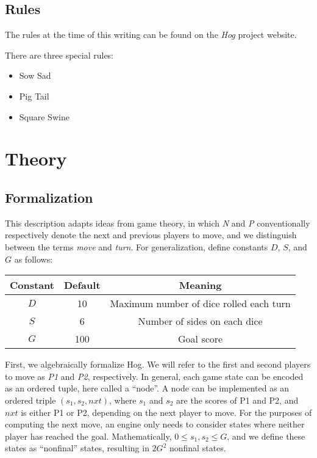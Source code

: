 \documentclass[12 pt]{article}
\begin{document}
		\subsection{Rules}
			The rules at the time of this writing can be found on the \textit{Hog} project website.

			There are three special rules:
			\begin{itemize}
				\item Sow Sad
				\item Pig Tail
				\item Square Swine
			\end{itemize}

	\section{Theory}
		\subsection{Formalization}
			This description adapts ideas from game theory, in which \textit{N} and \textit{P} conventionally respectively denote the next and previous players to move, and we distinguish between the terms \textit{move} and \textit{turn}. For generalization, define constants $D$, $S$, and $G$ as follows:

			\begin{center}
				\begin{tabular}{|c|c|c|}
					\hline
					Constant & Default & Meaning \\
					\hline
					$D$ & 10 & Maximum number of dice rolled each turn \\
					$S$ & 6 & Number of sides on each dice \\
					$G$ & 100 & Goal score \\
					\hline
				\end{tabular}
			\end{center}

			First, we algebraically formalize Hog. We will refer to the first and second players to move as \textit{P1} and \textit{P2}, respectively. In general, each game state can be encoded as an ordered tuple, here called a ``node''. A node can be implemented as an ordered triple $(s_1, s_2, \mathit{nxt})$, where $s_1$ and $s_2$ are the scores of P1 and P2, and $\mathit{nxt}$ is either P1 or P2, depending on the next player to move. For the purposes of computing the next move, an engine only needs to consider states where neither player has reached the goal. Mathematically, $0 \le s_1, s_2 \le G$, and we define these states as ``nonfinal'' states, resulting in $2G^2$ nonfinal states.
\end{document}
